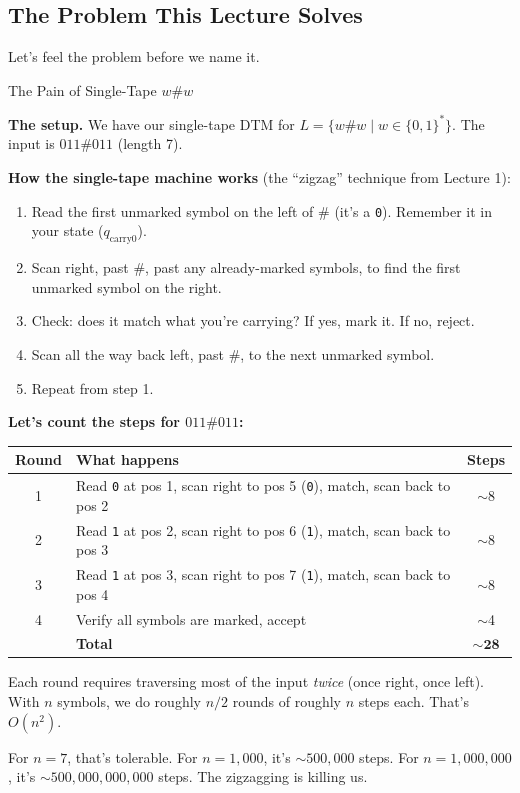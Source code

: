 \subsection{The Problem This Lecture Solves}
\label{subsec:motivation}

Let's feel the problem before we name it.

\begin{examplebox}{The Pain of Single-Tape $w\#w$}

\textbf{The setup.} We have our single-tape DTM for $L = \{w\#w \mid w \in \{0,1\}^*\}$. The input is $011\#011$ (length 7).

\textbf{How the single-tape machine works} (the ``zigzag'' technique from Lecture 1):
\begin{enumerate}[nosep]
\item Read the first unmarked symbol on the left of \# (it's a \texttt{0}). Remember it in your state ($q_{\text{carry0}}$).
\item Scan right, past \#, past any already-marked symbols, to find the first unmarked symbol on the right.
\item Check: does it match what you're carrying? If yes, mark it. If no, reject.
\item Scan all the way back left, past \#, to the next unmarked symbol.
\item Repeat from step 1.
\end{enumerate}

\textbf{Let's count the steps for $011\#011$:}

\begin{center}
\begin{tabular}{clc}
\toprule
\textbf{Round} & \textbf{What happens} & \textbf{Steps} \\
\midrule
1 & Read \texttt{0} at pos 1, scan right to pos 5 (\texttt{0}), match, scan back to pos 2 & $\sim$8 \\
2 & Read \texttt{1} at pos 2, scan right to pos 6 (\texttt{1}), match, scan back to pos 3 & $\sim$8 \\
3 & Read \texttt{1} at pos 3, scan right to pos 7 (\texttt{1}), match, scan back to pos 4 & $\sim$8 \\
4 & Verify all symbols are marked, accept & $\sim$4 \\
\midrule
& \textbf{Total} & $\mathbf{\sim 28}$ \\
\bottomrule
\end{tabular}
\end{center}

Each round requires traversing most of the input \textit{twice} (once right, once left). With $n$ symbols, we do roughly $n/2$ rounds of roughly $n$ steps each. That's $O(n^2)$.

For $n = 7$, that's tolerable. For $n = 1{,}000$, it's ${\sim}500{,}000$ steps. For $n = 1{,}000{,}000$, it's ${\sim}500{,}000{,}000{,}000$ steps. The zigzagging is killing us.
\end{examplebox}

